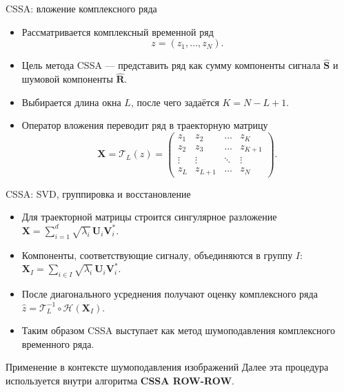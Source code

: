 \documentclass[unicode,notheorems]{beamer}
\begin{document}
\begin{frame}{CSSA: вложение комплексного ряда}
	\small
	\begin{itemize}
		\item Рассматривается комплексный временной ряд
		\[
		z = (z_1,\dots,z_N).
		\]
		\item Цель метода CSSA --- представить ряд как сумму компоненты сигнала $\hat{\mathbf{S}} $ и шумовой компоненты $\hat{\mathbf{R}}$.
		\item Выбирается длина окна $L$, после чего задаётся $K = N - L + 1$.
		\item Оператор вложения переводит ряд в траекторную матрицу
		\[
		\mathbf{X} = \mathcal{T}_L(z) =
		\begin{pmatrix}
			z_1 & z_2 & \dots & z_K \\
			z_2 & z_3 & \dots & z_{K+1} \\
			\vdots & \vdots & \ddots & \vdots \\
			z_L & z_{L+1} & \dots & z_N
		\end{pmatrix}.
		\]
	\end{itemize}
\end{frame}

\begin{frame}{CSSA: SVD, группировка и восстановление}
	\small
	\begin{itemize}
		\item Для траекторной матрицы строится сингулярное разложение
		$\mathbf{X} = \sum_{i=1}^{d} \sqrt{\lambda_i}\,\mathbf{U}_i \mathbf{V}_i^{*}$.
		\item Компоненты, соответствующие сигналу, объединяются в группу $I$:
		$\mathbf{X}_{I} = \sum_{i\in I} \sqrt{\lambda_i}\,\mathbf{U}_i \mathbf{V}_i^{*}$.
		\item После диагонального усреднения получают оценку комплексного ряда
		$\widehat{z} = \mathcal{T}_L^{-1}\circ\mathcal{H}(\mathbf{X}_{I})$.
		\item Таким образом CSSA выступает как метод шумоподавления комплексного временного ряда.
	\end{itemize}

	\begin{block}{Применение в контексте шумоподавления изображений}
		Далее эта процедура используется внутри алгоритма \textbf{CSSA ROW-ROW}.
	\end{block}
\end{frame}
\end{document}
